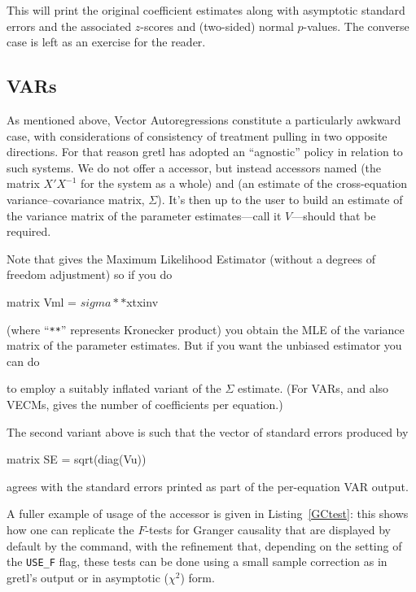 This will print the original coefficient estimates along with
asymptotic standard errors and the associated
$z$-scores and (two-sided) normal $p$-values. The converse case is
left as an exercise for the reader.

\subsection{VARs}

As mentioned above, Vector Autoregressions constitute a particularly
awkward case, with considerations of consistency of treatment pulling
in two opposite directions. For that reason gretl has adopted an
``agnostic'' policy in relation to such systems. We do not offer a
 accessor, but instead accessors named 
(the matrix $X'X^{-1}$ for the system as a whole) and 
(an estimate of the cross-equation variance--covariance matrix,
$\Sigma$). It's then up to the user to build an estimate of the
variance matrix of the parameter estimates---call it $V$---should that
be required.

Note that  gives the Maximum Likelihood Estimator
(without a degrees of freedom adjustment) so if you do
%
\begin{code}
matrix Vml = $sigma ** $xtxinv
\end{code}
%
(where ``\texttt{**}'' represents Kronecker product) you obtain the
MLE of the variance matrix of the parameter estimates. But if you want
the unbiased estimator you can do
%
%
to employ a suitably inflated variant of the
$\Sigma$ estimate. (For VARs, and also VECMs,  gives
the number of coefficients per equation.)

The second variant above is such that the vector of standard errors
produced by
%
\begin{code}
matrix SE = sqrt(diag(Vu))
\end{code}
%
agrees with the standard errors printed as part of the per-equation
VAR output.

A fuller example of usage of the  accessor is given in
Listing~\ref{GCtest}: this shows how one can replicate the $F$-tests
for Granger causality that are displayed by default by the 
command, with the refinement that, depending on the setting of the
\verb|USE_F| flag, these tests can be done using a small sample
correction as in gretl's output or in asymptotic ($\chi^2$) form.

